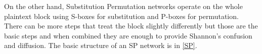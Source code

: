 \documentclass[12pt,twoside,a4paper]{report}
\begin{document}
    
    On the other hand, Substitution Permutation networks operate on the whole plaintext block using S-boxes for substitution and P-boxes for permutation. There can be more steps that treat the block slightly differently but those are the basic steps and when combined they are enough to provide Shannon's confusion and diffusion\cite{Shannon1949}. The basic structure of an SP network is in \autoref{SP}.
    
    
    
\end{document}
